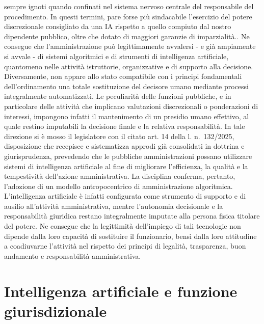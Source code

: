 \documentclass[american,a4paper,]{article}
\begin{document}
{sempre ignoti quando confinati nel sistema nervoso centrale del responsabile del procedimento. In questi termini, pare forse più sindacabile l'esercizio del potere discrezionale consigliato da una IA rispetto a quello compiuto dal nostro dipendente pubblico, oltre che dotato di maggiori garanzie di imparzialità.}. Ne consegue che l'amministrazione può legittimamente avvalersi - e già ampiamente si avvale - di sistemi algoritmici e di strumenti di intelligenza artificiale, quantomeno nelle attività istruttorie, organizzative e di supporto alla decisione. Diversamente, non appare allo stato compatibile con i principi fondamentali dell'ordinamento una totale sostituzione del decisore umano mediante processi integralmente automatizzati. Le peculiarità delle funzioni pubbliche, e in particolare delle attività che implicano valutazioni discrezionali o ponderazioni di interessi, impongono infatti il mantenimento di un presidio umano effettivo, al quale restino imputabili la decisione finale e la relativa responsabilità. In tale direzione si è mosso il legislatore con il citato art. 14 della l. n.~132/2025, disposizione che recepisce e sistematizza approdi già consolidati in dottrina e giurisprudenza, prevedendo che le pubbliche amministrazioni possano utilizzare sistemi di intelligenza artificiale al fine di migliorare l'efficienza, la qualità e la tempestività dell'azione amministrativa. La disciplina conferma, pertanto, l'adozione di un modello antropocentrico di amministrazione algoritmica. L'intelligenza artificiale è infatti configurata come strumento di supporto e di ausilio all'attività amministrativa, mentre l'autonomia decisionale e la responsabilità giuridica restano integralmente imputate alla persona fisica titolare del potere. Ne consegue che la legittimità dell'impiego di tali tecnologie non dipende dalla loro capacità di sostituire il funzionario, bensì dalla loro attitudine a coadiuvarne l'attività nel rispetto dei principi di legalità, trasparenza, buon andamento e responsabilità amministrativa.

\section{Intelligenza artificiale e funzione giurisdizionale}\label{intelligenza-artificiale-e-funzione-giurisdizionale}
\end{document}
